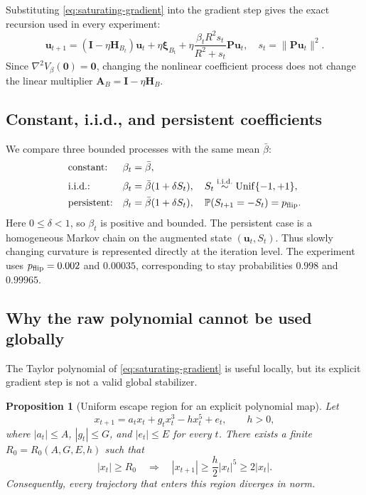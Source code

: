 \documentclass[11pt]{article}
\newtheorem{proposition}[theorem]{Proposition}
\theoremstyle{definition}
\newcommand{\Pp}{\mathbb P}
\newcommand{\Id}{\mathbf I}
\newcommand{\uvec}{\mathbf u}
\newcommand{\Avec}{\mathbf A}
\newcommand{\Hvec}{\mathbf H}
\newcommand{\Pvec}{\mathbf P}
\newcommand{\xivec}{\boldsymbol\xi}
\begin{document}
Substituting \eqref{eq:saturating-gradient} into the gradient step gives the
exact recursion used in every experiment:
\begin{equation}
  \uvec_{t+1}
  =(\Id-\eta\Hvec_{B_t})\uvec_t+\eta\xivec_{B_t}
   +\eta\frac{\beta_tR^2s_t}{R^2+s_t}\Pvec\uvec_t,
  \quad s_t=\|\Pvec\uvec_t\|^2.
  \label{eq:exact-discrete-update}
\end{equation}
Since $\nabla^2V_\beta(\mathbf0)=\mathbf0$, changing the nonlinear
coefficient process does not change the linear multiplier
$\Avec_B=\Id-\eta\Hvec_B$.

\subsection{Constant, i.i.d., and persistent coefficients}

We compare three bounded processes with the same mean $\bar\beta$:
\begin{align}
  &\text{constant:} &&\beta_t=\bar\beta,\notag\\
  &\text{i.i.d.:} &&\beta_t=\bar\beta(1+\delta S_t),
      \quad S_t\stackrel{\mathrm{i.i.d.}}{\sim}
      \operatorname{Unif}\{-1,+1\},\notag\\
  &\text{persistent:} &&\beta_t=\bar\beta(1+\delta S_t),
      \quad \Pp(S_{t+1}=-S_t)=p_{\mathrm{flip}}.
  \label{eq:beta-processes}
\end{align}
Here $0\leq\delta<1$, so $\beta_t$ is positive and bounded.  The persistent case is a homogeneous
Markov chain on the augmented state $(\uvec_t,S_t)$.  Thus slowly changing
curvature is represented directly at the iteration level.  The experiment
uses $p_{\rm flip}=0.002$ and $0.00035$, corresponding to stay probabilities
$0.998$ and $0.99965$.

\subsection{Why the raw polynomial cannot be used globally}

The Taylor polynomial of \eqref{eq:saturating-gradient} is useful locally,
but its explicit gradient step is not a valid global stabilizer.

\begin{proposition}[Uniform escape region for an explicit polynomial map]
\label{prop:polynomial-escape}
Let
\begin{equation}
  x_{t+1}=a_tx_t+g_tx_t^3-hx_t^5+e_t,
  \qquad h>0,
  \label{eq:polynomial-map}
\end{equation}
where $|a_t|\leq A$, $|g_t|\leq G$, and $|e_t|\leq E$ for every $t$.
There exists a finite $R_0=R_0(A,G,E,h)$ such that
\begin{equation}
  |x_t|\geq R_0
  \quad\Longrightarrow\quad
  |x_{t+1}|\geq\frac h2|x_t|^5\geq2|x_t|.
  \label{eq:escape-bound}
\end{equation}
Consequently, every trajectory that enters this region diverges in norm.
\end{proposition}
\end{document}
